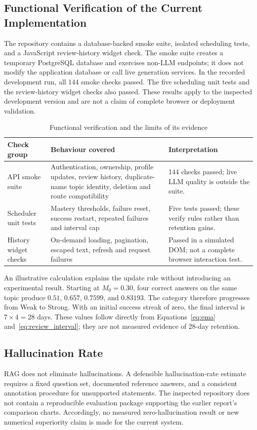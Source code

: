 \documentclass[11pt, a4paper, oneside]{report}
\begin{document}
\subsection{Functional Verification of the Current Implementation}
The repository contains a database-backed smoke suite, isolated scheduling tests, and a JavaScript review-history widget check. The smoke suite creates a temporary PostgreSQL database and exercises non-LLM endpoints; it does not modify the application database or call live generation services. In the recorded development run, all 144 smoke checks passed. The five scheduling unit tests and the review-history widget checks also passed. These results apply to the inspected development version and are not a claim of complete browser or deployment validation.

\begin{table}[H]
\centering\small
\caption{Functional verification and the limits of its evidence}
\label{tab:functional_checks}
\begin{tabular}{@{}p{3.1cm} p{5cm} p{4.3cm}@{}}
\toprule
\textbf{Check group} & \textbf{Behaviour covered} & \textbf{Interpretation} \\
\midrule
API smoke suite & Authentication, ownership, profile updates, review history, duplicate-name topic identity, deletion and route compatibility & 144 checks passed; live LLM quality is outside the suite. \\[5pt]
Scheduler unit tests & Mastery thresholds, failure reset, success restart, repeated failures and interval cap & Five tests passed; these verify rules rather than retention gains. \\[5pt]
History widget checks & On-demand loading, pagination, escaped text, refresh and request failures & Passed in a simulated DOM; not a complete browser interaction test. \\
\bottomrule
\end{tabular}
\end{table}

An illustrative calculation explains the update rule without introducing an experimental result. Starting at $M_0=0.30$, four correct answers on the same topic produce $0.51$, $0.657$, $0.7599$, and $0.83193$. The category therefore progresses from Weak to Strong. With an initial success streak of zero, the final interval is $7\times4=28$ days. These values follow directly from Equations~\ref{eq:ema} and~\ref{eq:review_interval}; they are not measured evidence of 28-day retention.

\subsection{Hallucination Rate}
RAG does not eliminate hallucinations. A defensible hallucination-rate estimate requires a fixed question set, documented reference answers, and a consistent annotation procedure for unsupported statements. The inspected repository does not contain a reproducible evaluation package supporting the earlier report's comparison charts. Accordingly, no measured zero-hallucination result or new numerical superiority claim is made for the current system.
\end{document}
